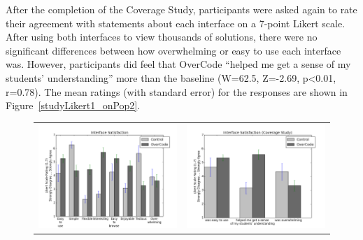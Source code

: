 After the completion of the Coverage Study, participants were asked again to rate their agreement with statements about each interface on a 7-point Likert scale. After using both interfaces to view thousands of solutions, there were no significant differences between how overwhelming or easy to use each interface was. However, participants did feel that OverCode ``helped me get a sense of my students' understanding'' more than the baseline (W=62.5, Z=-2.69, p<0.01, r=0.78). The mean ratings (with standard error) for the responses are shown in Figure~\ref{studyLikert1_onPop2}.

\begin{figure}
\centering
\begin{tabular}{c c}
\begin{minipage}{.6\linewidth}
\centering
\includegraphics[scale=0.35]{Body/figures/overcode/study2Likert.png}
\end{minipage}
&
\begin{minipage}{.4\linewidth}
\centering
\includegraphics[scale=0.30]{Body/figures/overcode/study1Likert_onPop2.png}

\end{minipage}
\end{tabular}
\end{figure}

